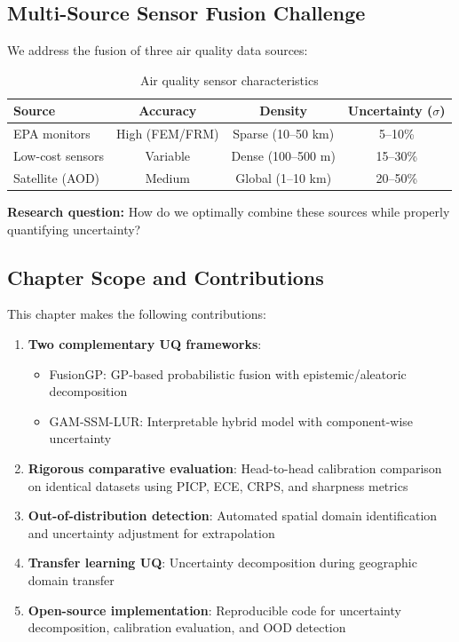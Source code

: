\documentclass[11pt,letterpaper]{article}
\begin{document}
\subsection{Multi-Source Sensor Fusion Challenge}

We address the fusion of three air quality data sources:

\begin{table}[h]
\centering
\caption{Air quality sensor characteristics}
\label{tab:sensors}
\small
\begin{tabular}{@{}lccc@{}}
\toprule
\textbf{Source} & \textbf{Accuracy} & \textbf{Density} & \textbf{Uncertainty ($\sigma$)} \\
\midrule
EPA monitors & High (FEM/FRM) & Sparse (10--50 km) & 5--10\% \\
Low-cost sensors & Variable & Dense (100--500 m) & 15--30\% \\
Satellite (AOD) & Medium & Global (1--10 km) & 20--50\% \\
\bottomrule
\end{tabular}
\end{table}

\textbf{Research question:} How do we optimally combine these sources while properly quantifying uncertainty?

\subsection{Chapter Scope and Contributions}

This chapter makes the following contributions:

\begin{enumerate}
    \item \textbf{Two complementary UQ frameworks}:
    \begin{itemize}
        \item FusionGP: GP-based probabilistic fusion with epistemic/aleatoric decomposition
        \item GAM-SSM-LUR: Interpretable hybrid model with component-wise uncertainty
    \end{itemize}

    \item \textbf{Rigorous comparative evaluation}: Head-to-head calibration comparison on identical datasets using PICP, ECE, CRPS, and sharpness metrics

    \item \textbf{Out-of-distribution detection}: Automated spatial domain identification and uncertainty adjustment for extrapolation

    \item \textbf{Transfer learning UQ}: Uncertainty decomposition during geographic domain transfer

    \item \textbf{Open-source implementation}: Reproducible code for uncertainty decomposition, calibration evaluation, and OOD detection
\end{enumerate}
\end{document}
